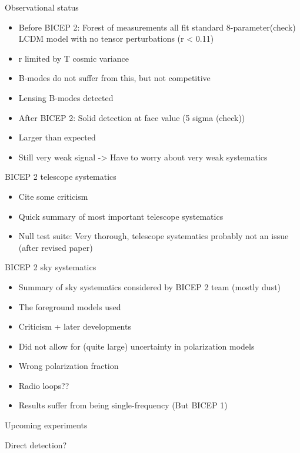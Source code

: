 \documentclass{beamer}
\begin{document}
\begin{frame}{Observational status}
	\begin{itemize}
		\item Before BICEP 2: Forest of measurements all fit standard 8-parameter(check)
			LCDM model with no tensor perturbations (r < 0.11)
		\item r limited by T cosmic variance
		\item B-modes do not suffer from this, but not competitive
		\item Lensing B-modes detected
		\item After BICEP 2: Solid detection at face value (5 sigma (check))
		\item Larger than expected
		\item Still very weak signal -> Have to worry about very weak systematics
	\end{itemize}
\end{frame}

\begin{frame}{BICEP 2 telescope systematics}
	\begin{itemize}
		\item Cite some criticism
		\item Quick summary of most important telescope systematics
		\item Null test suite: Very thorough, telescope systematics probably not an issue
			(after revised paper)
	\end{itemize}
\end{frame}

\begin{frame}{BICEP 2 sky systematics}
	\begin{itemize}
		\item Summary of sky systematics considered by BICEP 2 team (mostly dust)
		\item The foreground models used
		\item Criticism + later developments
		\item Did not allow for (quite large) uncertainty in polarization models
		\item Wrong polarization fraction
		\item Radio loops??
		\item Results suffer from being single-frequency (But BICEP 1)
	\end{itemize}
\end{frame}

\begin{frame}{Upcoming experiments}
\end{frame}

\begin{frame}{Direct detection?}
\end{frame}
\end{document}
